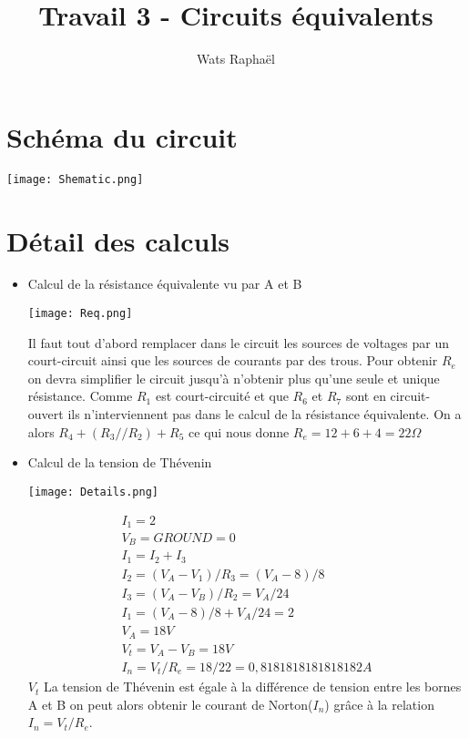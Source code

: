 \documentclass{homeworg}
\title{Travail 3 - Circuits équivalents}
\author{Wats Raphaël}
\begin{document}
\maketitle

\section{Schéma du circuit}
    \begin{center}
        \texttt{[image: Shematic.png]}
    \end{center}

\newpage
\section{Détail des calculs}
    \begin{itemize}
        \item Calcul de la résistance équivalente vu par A et B
            \begin{center}
                \texttt{[image: Req.png]}
            \end{center}
            Il faut tout d'abord remplacer dans le circuit les sources de voltages par un court-circuit ainsi que les sources de courants par des trous. Pour obtenir $R_e$ on devra simplifier le circuit jusqu'à n'obtenir plus qu'une seule et unique résistance. Comme $R_1$ est court-circuité et que $R_6$ et $R_7$ sont en circuit-ouvert ils n'interviennent pas dans le calcul de la résistance équivalente. On a alors $R_4 + (R_3 // R_2) + R_5$ ce qui nous donne $R_e = 12 + 6 + 4 = 22\Omega$
        \item Calcul de la tension de Thévenin
            \begin{center}
                \texttt{[image: Details.png]}
            \end{center}
            \begin{align}
                I_1 = 2\\
                V_B = GROUND = 0\\
                I_1 = I_2 + I_3\\
                I_2 = (V_A - V_1) / R_3 = (V_A - 8) / 8\\
                I_3 = (V_A - V_B) / R_2 = V_A / 24\\
                I_1 = (V_A - 8) / 8 + V_A / 24 = 2\\
                V_A = 18V\\
                V_t = V_A - V_B = 18V\\
                I_n = V_t / R_e = 18/22 = 0,8181818181818182A
            \end{align}
            $V_t$ La tension de Thévenin est égale à la différence de tension entre les bornes A et B on peut alors obtenir le courant de Norton($I_n$) grâce à la relation $I_n = V_t / R_e$.
    \end{itemize}
\end{document}
